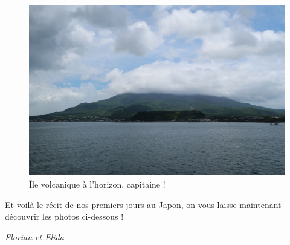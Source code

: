\begin{figure}
\centering
\includegraphics{images/20180709_sakurajima.JPG}
\caption{Île volcanique à l'horizon, capitaine !}
\end{figure}

Et voilà le récit de nos premiers jours au Japon, on vous laisse
maintenant découvrir les photos ci-dessous !

\emph{Florian et Elida}
